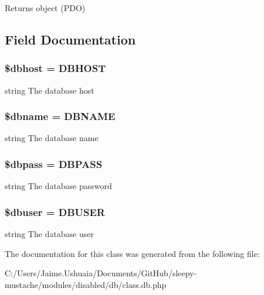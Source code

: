 \begin{DoxyReturn}{Returns}
object (P\-D\-O) 
\end{DoxyReturn}


\subsection{Field Documentation}
\hypertarget{class_d_b_a580dd98ba7f04c133d1a1e1b01af4a30}{
\subsubsection[{\$dbhost}]{\setlength{\rightskip}{0pt plus 5cm}\$dbhost = D\-B\-H\-O\-S\-T\hspace{0.3cm}{\ttfamily [static]}}}\label{class_d_b_a580dd98ba7f04c133d1a1e1b01af4a30}
string The database host \hypertarget{class_d_b_ac5111a571fffa2499732833bb7f0d8c1}{
\subsubsection[{\$dbname}]{\setlength{\rightskip}{0pt plus 5cm}\$dbname = D\-B\-N\-A\-M\-E\hspace{0.3cm}{\ttfamily [static]}}}\label{class_d_b_ac5111a571fffa2499732833bb7f0d8c1}
string The database name \hypertarget{class_d_b_a95e283b6dd5867f7b99c160bebf9826c}{
\subsubsection[{\$dbpass}]{\setlength{\rightskip}{0pt plus 5cm}\$dbpass = D\-B\-P\-A\-S\-S\hspace{0.3cm}{\ttfamily [static]}}}\label{class_d_b_a95e283b6dd5867f7b99c160bebf9826c}
string The database password \hypertarget{class_d_b_a8d5ac1c3396a540f025f9bbe56a5b568}{
\subsubsection[{\$dbuser}]{\setlength{\rightskip}{0pt plus 5cm}\$dbuser = D\-B\-U\-S\-E\-R\hspace{0.3cm}{\ttfamily [static]}}}\label{class_d_b_a8d5ac1c3396a540f025f9bbe56a5b568}
string The database user 

The documentation for this class was generated from the following file\-:\begin{DoxyCompactItemize}
\item 
C\-:/\-Users/\-Jaime.\-Ushuaia/\-Documents/\-Git\-Hub/sleepy-\/mustache/modules/disabled/db/class.\-db.\-php\end{DoxyCompactItemize}
